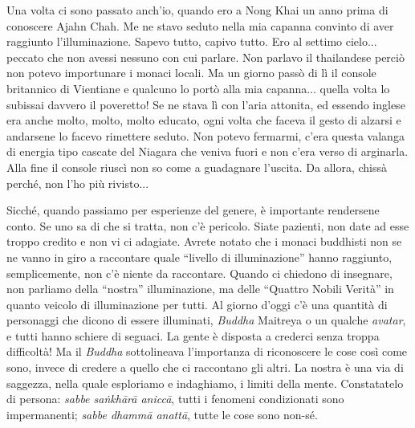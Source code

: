 Una volta ci sono passato anch'io, quando ero a Nong Khai un anno prima
di conoscere Ajahn Chah. Me ne stavo seduto nella mia capanna convinto
di aver raggiunto l'illuminazione. Sapevo tutto, capivo tutto. Ero al
settimo cielo... peccato che non avessi nessuno con cui parlare. Non
parlavo il thailandese perciò non potevo importunare i monaci locali. Ma
un giorno passò di lì il console britannico di Vientiane e qualcuno lo
portò alla mia capanna... quella volta lo subissai davvero il poveretto!
Se ne stava lì con l'aria attonita, ed essendo inglese era anche molto,
molto, molto educato, ogni volta che faceva il gesto di alzarsi e
andarsene lo facevo rimettere seduto. Non potevo fermarmi, c'era questa
valanga di energia tipo cascate del Niagara che veniva fuori e non c'era
verso di arginarla. Alla fine il console riuscì non so come a guadagnare
l'uscita. Da allora, chissà perché, non l'ho più rivisto...

Sicché, quando passiamo per esperienze del genere, è importante
rendersene conto. Se uno sa di che si tratta, non c'è pericolo. Siate
pazienti, non date ad esse troppo credito e non vi ci adagiate. Avrete
notato che i monaci buddhisti non se ne vanno in giro a raccontare quale
``livello di illuminazione'' hanno raggiunto, semplicemente, non c'è
niente da raccontare. Quando ci chiedono di insegnare, non parliamo
della ``nostra'' illuminazione, ma delle ``Quattro Nobili Verità'' in quanto
veicolo di illuminazione per tutti. Al giorno d'oggi c'è una quantità di
personaggi che dicono di essere illuminati, \textit{Buddha} Maitreya o un qualche
\textit{avatar}, e tutti hanno schiere di seguaci. La gente è disposta a crederci
senza troppa difficoltà! Ma il \textit{Buddha} sottolineava l'importanza di
riconoscere le cose così come sono, invece di credere a quello che ci
raccontano gli altri. La nostra è una via di saggezza, nella quale
esploriamo e indaghiamo, i limiti della mente. Constatatelo di persona:
\textit{sabbe saṅkhārā aniccā}, tutti i fenomeni condizionati sono impermanenti;
\textit{sabbe dhammā anattā}, tutte le cose sono non-sé.
